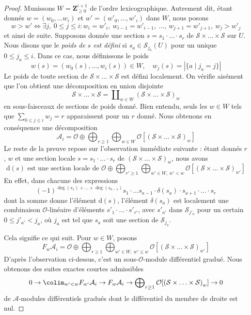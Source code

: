 \begin{proof}
\medskip\noindent
Munissons $W = \mathbf{Z}_{\geq 0}^{i + 1}$ de l'ordre lexicographique.
Autrement dit, étant donnés $w = (w_0, \ldots w_i)$ et
$w' = (w'_0, \ldots, w'_i)$ dans $W$, nous posons
$$
w > w' \Leftrightarrow
\exists j,\ 0 \leq j \leq i :
w_i = w'_i,\ w_{i - 1} = w'_{i - 1},\ \ldots ,
\ w_{j + 1} = w'_{j + 1},\ w_j > w'_j
$$
et ainsi de suite. Supposons donnée une section
$s = s_1 \cdot \ldots \cdot s_r$ de
$\mathcal{S} \times \ldots \times \mathcal{S}$
sur $U$. Nous disons que le {\it poids de $s$ est défini}
si $s_a \in \mathcal{S}_{j_a}(U)$ pour un unique
$0 \leq j_a \leq i$. Dans ce cas, nous définissons le poids
$$
w(s) = (w_0(s), \ldots, w_i(s)) \in W,\quad
w_j(s) = |\{a \mid j_a = j\}|
$$
Le poids de toute section de $\mathcal{S} \times \ldots \times \mathcal{S}$
est défini localement. On vérifie aisément que l'on obtient une décomposition
en union disjointe
$$
\mathcal{S} \times \ldots \times \mathcal{S} =
\coprod\nolimits_{w \in W} \left(
\mathcal{S} \times \ldots \times \mathcal{S}\right)_w
$$
en sous-faisceaux de sections de poids donné. Bien entendu,
seuls les $w \in W$ tels que $\sum_{0 \leq j \leq i} w_j = r$ apparaissent pour un $r$ donné.
Nous obtenons en conséquence une décomposition
$$
\mathcal{A}_i = \mathcal{O} \oplus
\bigoplus\nolimits_{r \geq 1}
\bigoplus\nolimits_{w \in W}
\mathcal{O}[\left(\mathcal{S} \times \ldots \times \mathcal{S}\right)_w]
$$
Le reste de la preuve repose sur l'observation immédiate suivante :
étant donnés $r$, $w$ et une section locale $s = s_1 \cdot \ldots \cdot s_r$ de
$\left(\mathcal{S} \times \ldots \times \mathcal{S}\right)_w$,
nous avons
$$
\text{d}(s) \text{ est une section locale de } \mathcal{O} \oplus
\bigoplus\nolimits_{r' \geq 1}
\bigoplus\nolimits_{w' \in W,\ w' < w}
\mathcal{O}[\left(\mathcal{S} \times \ldots \times \mathcal{S}\right)_{w'}]
$$
En effet, dans chacune des expressions
$$
(-1)^{\deg(s_1) + \ldots + \deg(s_{a - 1})}
s_1 \cdot \ldots s_{a - 1} \cdot \delta(s_a) \cdot
s_{a + 1} \cdot \ldots \cdot s_r
$$
dont la somme donne l'élément $\text{d}(s)$, l'élément $\delta(s_a)$
est localement une combinaison $\mathcal{O}$-linéaire d'éléments
$s'_1 \cdot \ldots \cdot s'_{r'}$, avec $s'_{a'}$ dans
$\mathcal{S}_{j'_a}$ pour un certain $0 \leq j'_{a'} < j_a$, où $j_a$ est tel que
$s_a$ soit une section de $\mathcal{S}_{j_a}$.

\medskip\noindent
Cela signifie ce qui suit. Pour $w \in W$, posons
$$
F_w \mathcal{A}_i = \mathcal{O} \oplus \bigoplus\nolimits_{r \geq 1}
\bigoplus\nolimits_{w' \in W,\ w' \leq w}
\mathcal{O}[\left(\mathcal{S} \times \ldots \times \mathcal{S}\right)_{w'}]
$$
D'après l'observation ci-dessus, c'est un sous-$\mathcal{O}$-module différentiel gradué.
Nous obtenons des suites exactes courtes admissibles
$$
0 \to \colim_{w' < w} F_{w'}\mathcal{A}_i \to
F_w\mathcal{A}_i \to
\bigoplus\nolimits_{r \geq 1}
\mathcal{O}[\left(\mathcal{S} \times \ldots \times \mathcal{S}\right)_w]
\to 0
$$
de $\mathcal{A}$-modules différentiels gradués dont le différentiel
du membre de droite est nul.


\end{proof}
